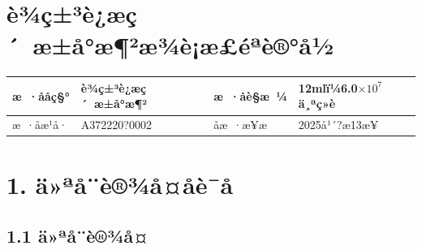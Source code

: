 \documentclass[UTF8,10pt,a4paper,fontset=fandol]{ctexart}
\newcommand{\fieldvalue}[1]{#1}
\newcommand{\handwritten}[1]{#1}
\begin{document}
\newpage

\section*{è¾ç±³è¿æç´ æ±å°æ¶²æ¾è¡æ£éªè®°å½}

\begin{tabularx}{\textwidth}{|p{3cm}|X|p{3cm}|X|}
\hline
æ ·ååç§° & è¾ç±³è¿æç´ æ±å°æ¶² & æ ·åè§æ ¼ & 12mlï¼6.0$\times 10^{7}$ä¸ªç»è \\
\hline
æ ·åæ¹å· &
\fieldvalue{\handwritten{A372220?0002}} &
åæ ·æ¥æ & 2025å¹´?æ13æ¥ \\
\hline
\end{tabularx}

\section*{1. ä»ªå¨è®¾å¤åè¯å}

\subsection*{1.1 ä»ªå¨è®¾å¤}
\end{document}
